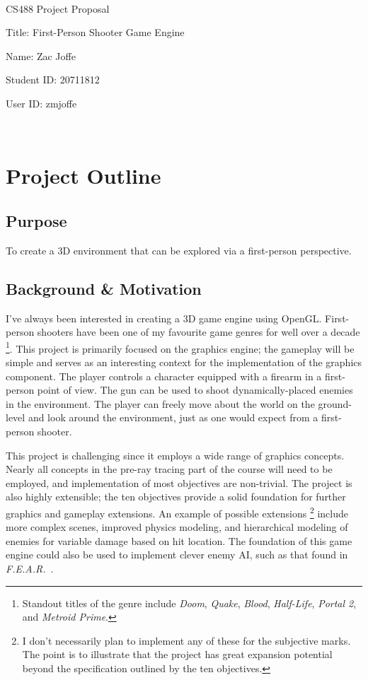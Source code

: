 \documentclass {article}
\begin{document}
~\vfill
\begin{center}
\Large

CS488 Project Proposal

Title: First-Person Shooter Game Engine

Name: Zac Joffe

Student ID: 20711812

User ID: zmjoffe

\end{center}
\vfill ~\vfill~

\newpage
\tableofcontents

\newpage
\section{Project Outline}
\subsection{Purpose}
To create a 3D environment that can be explored via a first-person perspective.

\subsection{Background \& Motivation}
I've always been interested in creating a 3D game engine using OpenGL. First-person shooters have been one of my favourite game genres for well over a decade \footnote{Standout titles of the genre include \textit{Doom}, \textit{Quake}, \textit{Blood}, \textit{Half-Life}, \textit{Portal 2}, and \textit{Metroid Prime}.}. This project is primarily focused on the graphics engine; the gameplay will be simple and serves as an interesting context for the implementation of the graphics component. The player controls a character equipped with a firearm in a first-person point of view. The gun can be used to shoot dynamically-placed enemies in the environment. The player can freely move about the world on the ground-level and look around the environment, just as one would expect from a first-person shooter.

This project is challenging since it employs a wide range of graphics concepts. Nearly all concepts in the pre-ray tracing part of the course will need to be employed, and implementation of most objectives are non-trivial. The project is also highly extensible; the ten objectives provide a solid foundation for further graphics and gameplay extensions. An example of possible extensions \footnote{I don't necessarily plan to implement any of these for the subjective marks. The point is to illustrate that the project has great expansion potential beyond the specification outlined by the ten objectives.} include more complex scenes, improved physics modeling, and hierarchical modeling of enemies for variable damage based on hit location. The foundation of this game engine could also be used to implement clever enemy AI, such as that found in \textit{F.E.A.R.}~\cite{fear}.
\end{document}

